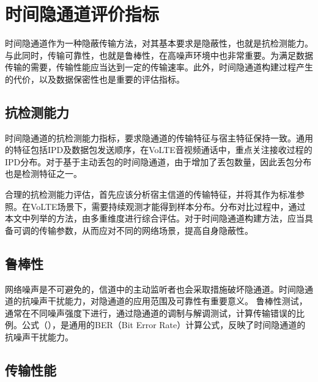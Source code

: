 \section{时间隐通道评价指标}
\label{chap:backinfo:metric}

时间隐通道作为一种隐蔽传输方法，对其基本要求是隐蔽性，也就是抗检测能力。与此同时，传输可靠性，也就是鲁棒性，在高噪声环境中也非常重要。为满足数据传输的需要，传输性能应当达到一定的传输速率。此外，时间隐通道构建过程产生的代价，以及数据保密性也是重要的评估指标。

\subsection{抗检测能力}
\label{chap:backinfo:metric:undetectability}

时间隐通道的抗检测能力指标，要求隐通道的传输特征与宿主特征保持一致。通用的特征包括IPD及数据包发送顺序，在VoLTE音视频通话中，重点关注接收过程的IPD分布。对于基于主动丢包的时间隐通道，由于增加了丢包数量，因此丢包分布也是检测特征之一。

合理的抗检测能力评估，首先应该分析宿主信道的传输特征，并将其作为标准参照。在VoLTE场景下，需要持续观测才能得到样本分布。分布对比过程中，通过本文中列举的方法，由多重维度进行综合评估。对于时间隐通道构建方法，应当具备可调的传输参数，从而应对不同的网络场景，提高自身隐蔽性。

\subsection{鲁棒性}
\label{chap:backinfo:metric:robustness}

网络噪声是不可避免的，信道中的主动监听者也会采取措施破坏隐通道。时间隐通道的抗噪声干扰能力，对隐通道的应用范围及可靠性有重要意义。
鲁棒性测试，通常在不同噪声强度下进行，通过隐通道的调制与解调测试，计算传输错误的比例。公式（），是通用的BER（Bit Error Rate）计算公式，反映了时间隐通道的抗噪声干扰能力。

\subsection{传输性能}
\label{chap:backinfo:metric:throughput}

